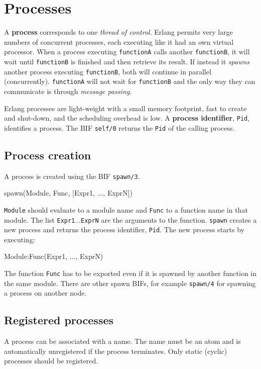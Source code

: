 \chapter{Processes}
\label{processes}

A \textbf{process} corresponds to one \textit{thread of control}.
Erlang permits very large numbers of concurrent processes,
each executing like it had an own virtual processor.  When a process
executing \texttt{functionA} calls another \texttt{functionB}, it
will wait until \texttt{functionB} is finished and then retrieve its
result. If instead it \textit{spawns} another process executing
\texttt{functionB}, both will continue in parallel
(concurrently). \texttt{functionA} will not wait for \texttt{functionB}
and the only way they can communicate is through \textit{message passing}.

Erlang processes are light-weight with a small memory footprint, fast to
create and shut-down, and the scheduling overhead is low.  A
\textbf{process identifier}, \texttt{Pid}, identifies a process. The
BIF \texttt{self/0} returns the \texttt{Pid} of the calling process.


\section{Process creation}
A process is created using the BIF \texttt{spawn/3}.

\begin{erlang}
spawn(Module, Func, [Expr1, ..., ExprN])
\end{erlang}

\texttt{Module} should evaluate to a module name and \texttt{Func} to
a function name in that module. The list \texttt{Expr1}$...$\texttt{ExprN} are the
arguments to the function.  \texttt{spawn} creates a new process and
returns the process identifier, \texttt{Pid}. The new process starts
by executing:

\begin{erlang}
Module:Func(Expr1, ..., ExprN)
\end{erlang}

The function \texttt{Func} has to be exported even if it is spawned by
another function in the same module. There are other spawn BIFs, for
example \texttt{spawn/4} for spawning a process on another node.


\section{Registered processes}
A process can be associated with a name. The name must be an atom and
is automatically unregistered if the process terminates. Only static
(cyclic) processes should be registered.

